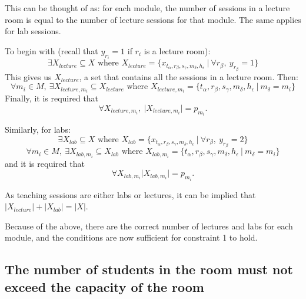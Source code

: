 \documentclass[a4paper, 12pt]{report}
\begin{document}
This can be thought of as: for each module, the number of sessions in a lecture 
room is equal to the number of lecture sessions for that module. The same 
applies for lab sessions.

To begin with (recall that \( y_{r_i} = 1 \) if \( r_i \) is a lecture room):
\begin{equation*}
	\exists X_{lecture} \subseteq X \text{ where } X_{lecture} = \{ 
	x_{t_{\alpha}, r_{\beta},s_{\gamma},m_{\delta},h_{\epsilon}} \: | \: \forall 
	r_{\beta}, \: y_{r_{\beta}} = 1\}
\end{equation*}
This gives us \( X_{lecture} \), a set that contains all the sessions in a 
lecture room. Then:
\begin{equation*}
	\forall m_i \in M, \: \exists X_{lecture,m_i} \subseteq X_{lecture} 
	\text{ where } X_{lecture,m_i} = \{ t_{\alpha},r_{\beta},s_{\gamma},
	m_{\delta},h_{\epsilon} \: | \: m_{\delta} = m_i\}
\end{equation*}
Finally, it is required that
\begin{equation*}
	\forall X_{lecture,m_i}, \: \lvert X_{lecture,m_i} \rvert = p_{m_i}.
\end{equation*}

Similarly, for labs:
\begin{equation*}
	\exists X_{lab} \subseteq X \text{ where } X_{lab} = \{ x_{t_{\alpha}, 
	r_{\beta},s_{\gamma},m_{\delta},h_{\epsilon}} \: | \: \forall r_{\beta}, \: 
	y_{r_{\beta}} = 2\}
\end{equation*}
\begin{equation*}
	\forall m_i \in M, \: \exists X_{lab,m_i} \subseteq X_{lab} \text{ where } 
	X_{lab,m_i} = \{ t_{\alpha},r_{\beta},s_{\gamma},m_{\delta},h_{\epsilon} \:
	| \: m_{\delta} = m_i\}
\end{equation*}
and it is required that
\begin{equation*}
	\forall X_{lab,m_i} \lvert X_{lab,m_i} \rvert = p_{m_i}.
\end{equation*}

As teaching sessions are either labs or lectures, it can be implied that \( 
\lvert X_{lecture} \rvert + \lvert X_{lab} \rvert = \lvert X \rvert \).

Because of the above, there are the correct number of lectures and labs for 
each module, and the conditions are now sufficient for constraint 1 to hold. 

\subsection{The number of students in the room must not exceed the capacity of 
	the room}
\end{document}
